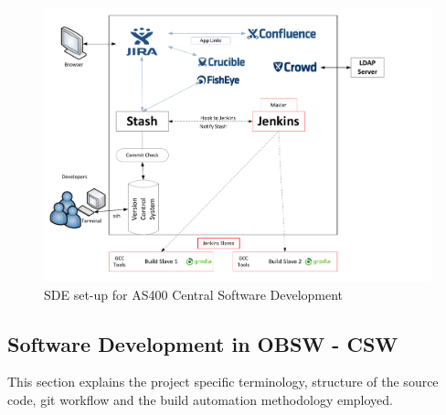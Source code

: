 \documentclass[12pt, a4paper, titlepage]{scrartcl}
\begin{document}
\begin{figure}[!ht]
\centering
\hspace*{-0.5cm}
	\includegraphics[scale=0.6]{SDE-Chart.pdf}
\caption{SDE set-up for AS400 Central Software Development}
\label{fig:sde-chart}
\end{figure}

\subsection{Software Development in OBSW - CSW}
This section explains the project specific terminology, structure of the source code, git workflow and the build automation methodology employed.
\end{document}
